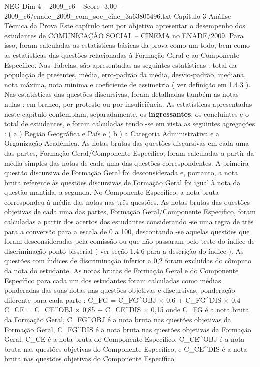 \begin{textsample}{NEG Dim 4 – 2009\_c6 – Score -3.00 – 2009\_c6/enade\_2009\_com\_soc\_cine\_3a63805496.txt}  \label{ex:f4_neg_033}
Capítulo 3 Análise Técnica da Prova Este capítulo tem por objetivo apresentar o desempenho dos estudantes de COMUNICAÇÃO SOCIAL – CINEMA no ENADE/2009.
Para isso, foram calculadas as estatísticas básicas da prova como um todo, bem como as estatísticas das questões relacionadas à Formação Geral e ao Componente Específico.
Nas Tabelas, são apresentadas as seguintes estatísticas : total da população de presentes, média, erro-padrão da média, desvio-padrão, mediana, nota máxima, nota mínima e coeficiente de assimetria ( ver definição em 1.4.3 ).
Nas estatísticas das questões discursivas, foram detalhadas também as notas nulas : em branco, por protesto ou por insuficiência.
As estatísticas apresentadas neste capítulo contemplam, separadamente, os \textbf{ingressantes}, os concluintes e o total de estudantes, e foram calculadas tendo -se em vista as seguintes agregações : ( a ) Região Geográfica e País e ( b ) a Categoria Administrativa e a Organização Acadêmica.
As notas brutas das questões discursivas em cada uma das partes, Formação Geral/Componente Específico, foram calculadas a partir da média simples das notas de cada uma das questões correspondentes.
A primeira questão discursiva de Formação Geral foi desconsiderada e, portanto, a nota bruta referente às questões discursivas de Formação Geral foi igual à nota da questão mantida, a segunda.
No Componente Específico, a nota bruta correspondeu à média das notas nas três questões.
As notas brutas das questões objetivas de cada uma das partes, Formação Geral/Componente Específico, foram calculadas a partir dos acertos dos estudantes considerando -se uma regra de três para a conversão para a escala de 0 a 100, descontando -se aquelas questões que foram desconsideradas pela comissão ou que não passaram pelo teste do índice de discriminação ponto-bisserial ( ver seção 1.4.6 para a descrição do índice ).
As questões com índices de discriminação inferior a 0,2 foram excluídas do cômputo da nota do estudante.
As notas brutas de Formação Geral e do Componente Específico para cada um dos estudantes foram calculadas como médias ponderadas das suas notas nas questões objetivas e discursivas, ponderação diferente para cada parte : C\_FG = C\_FG\textasciicircum{}OBJ × 0,6 + C\_FG\textasciicircum{}DIS × 0,4 C\_CE = C\_CE\textasciicircum{}OBJ × 0,85 + C\_CE\textasciicircum{}DIS × 0,15 onde C\_FG é a nota bruta da Formação Geral, C\_FG\textasciicircum{}OBJ é a nota bruta nas questões objetivas da Formação Geral, C\_FG\textasciicircum{}DIS é a nota bruta nas questões objetivas da Formação Geral, C\_CE é a nota bruta do Componente Específico, C\_CE\textasciicircum{}OBJ é a nota bruta nas questões objetivas do Componente Específico, e C\_CE\textasciicircum{}DIS é a nota bruta nas questões objetivas do Componente Específico.

\end{textsample}

